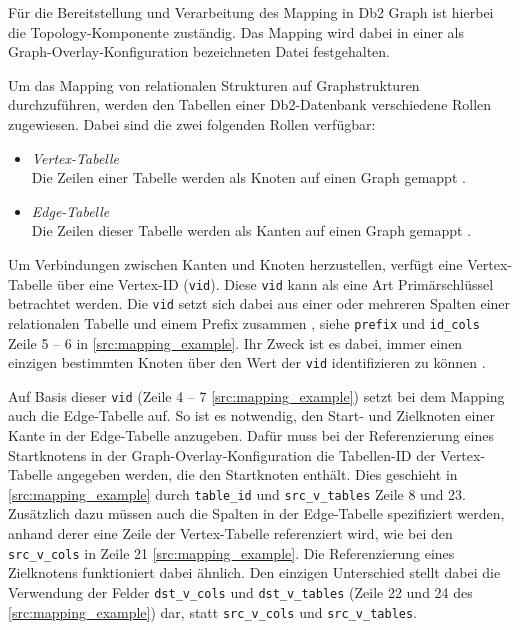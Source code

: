 Für die Bereitstellung und Verarbeitung des Mapping in Db2 Graph ist hierbei die Topology-Komponente zuständig. Das Mapping wird dabei in einer als Graph-Overlay-Konfiguration bezeichneten Datei festgehalten.  

Um das Mapping von relationalen Strukturen auf Graphstrukturen durchzuführen, werden den Tabellen einer Db2-Datenbank verschiedene Rollen zugewiesen. Dabei sind die zwei folgenden Rollen verfügbar:
\begin{itemize}
    \item \textit{Vertex-Tabelle}\\Die Zeilen einer Tabelle werden als Knoten auf einen Graph gemappt \cite{sigmod_tian, yt_tian}.
    \item \textit{Edge-Tabelle}\\Die Zeilen dieser Tabelle werden als Kanten auf einen Graph gemappt \cite{sigmod_tian, yt_tian}.
\end{itemize}

Um Verbindungen zwischen Kanten und Knoten herzustellen, verfügt eine Vertex-Tabelle über eine Vertex-ID (\texttt{\acs{vid}}). Diese \texttt{\acs{vid}} kann als eine Art Primärschlüssel betrachtet werden. Die \texttt{\acs{vid}} setzt sich dabei aus einer oder mehreren Spalten einer relationalen Tabelle und einem Prefix zusammen \cite{sigmod_tian, yt_tian}, siehe \texttt{prefix} und \texttt{id\_cols} Zeile 5 -- 6 in \autoref{src:mapping_example}. Ihr Zweck ist es dabei, immer einen einzigen bestimmten Knoten über den Wert der \texttt{\acs{vid}} identifizieren zu können \cite{sigmod_tian, yt_tian}. 

Auf Basis dieser \texttt{\acs{vid}} (Zeile 4 -- 7 \autoref{src:mapping_example}) setzt bei dem Mapping auch die Edge-Tabelle auf. So ist es notwendig, den Start- und Zielknoten einer Kante in der Edge-Tabelle anzugeben. Dafür muss bei der Referenzierung eines Startknotens in der Graph-Overlay-Konfiguration die Tabellen-ID der Vertex-Tabelle angegeben werden, die den Startknoten enthält. Dies geschieht in \autoref{src:mapping_example} durch \texttt{table\_id} und \texttt{src\_v\_tables} Zeile 8 und 23. Zusätzlich dazu müssen auch die Spalten in der Edge-Tabelle spezifiziert werden, anhand derer eine Zeile der Vertex-Tabelle referenziert wird, wie bei den \texttt{src\_v\_cols} in Zeile 21 \autoref{src:mapping_example}. Die Referenzierung eines Zielknotens funktioniert dabei ähnlich. Den einzigen Unterschied stellt dabei die Verwendung der Felder \texttt{dst\_v\_cols} und \texttt{dst\_v\_tables} (Zeile 22 und 24 des \autoref{src:mapping_example}) dar, statt \texttt{src\_v\_cols} und \texttt{src\_v\_tables}.


